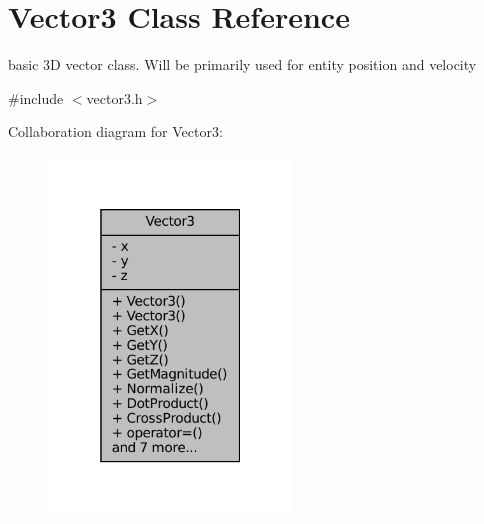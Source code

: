 \hypertarget{classVector3}{}\section{Vector3 Class Reference}
\label{classVector3}


basic 3D vector class. Will be primarily used for entity position and velocity  




{\ttfamily \#include $<$vector3.\+h$>$}



Collaboration diagram for Vector3\+:\nopagebreak
\begin{figure}[H]
\begin{center}
\leavevmode
\includegraphics[width=184pt]{classVector3__coll__graph}
\end{center}
\end{figure}
